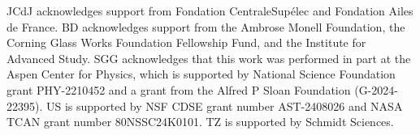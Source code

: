 \acknowledgments
\label{sec:acknowledgements}

\hspace{0.85cm}JCdJ acknowledges support from Fondation CentraleSupélec and Fondation Ailes de France. BD acknowledges support from the Ambrose Monell Foundation, the Corning Glass Works Foundation Fellowship Fund, and the Institute for Advanced Study. SGG acknowledges that this work was performed in part at the Aspen Center for Physics, which is supported by National Science Foundation grant PHY-2210452 and a grant from the Alfred P Sloan Foundation (G-2024-22395). %
US is supported by NSF CDSE grant number AST-2408026 and NASA TCAN grant number 80NSSC24K0101. TZ is supported by Schmidt Sciences.
 

